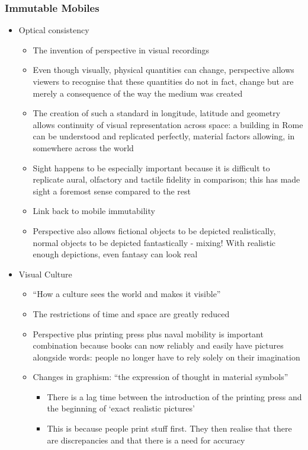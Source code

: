 \documentclass[a4paper]{article}
\begin{document}
\subsubsection{Immutable Mobiles}
\begin{itemize}
	\item Optical consistency
	\begin{itemize}[label=$\circ$]
		\item The invention of perspective in visual recordings
		\item Even though visually, physical quantities can change, perspective allows viewers to recognise that these quantities do not in fact, change but are merely a consequence of the way the medium was created
		\item The creation of such a standard in longitude, latitude and geometry allows continuity of visual representation across space: a building in Rome can be understood and replicated perfectly, material factors allowing, in somewhere across the world
		\item Sight happens to be especially important because it is difficult to replicate aural, olfactory and tactile fidelity in comparison; this has made sight a foremost sense compared to the rest
		\item Link back to mobile immutability
		\item Perspective also allows fictional objects to be depicted realistically, normal objects to be depicted fantastically - mixing! With realistic enough depictions, even fantasy can look real
	\end{itemize}
	\item Visual Culture
	\begin{itemize}[label=$\circ$]
		\item ``How a culture sees the world and makes it visible''
		\item The restrictions of time and space are greatly reduced
		\item Perspective plus printing press plus naval mobility is important combination because books can now reliably and easily have pictures alongside words: people no longer have to rely solely on their imagination
		\item Changes in graphism: “the expression of thought in material symbols”
		\begin{itemize}[label=\textsection]
			\item There is a lag time between the introduction of the printing press and the beginning of `exact realistic pictures'
			\item This is because people print stuff first. They then realise that there are discrepancies and that there is a need for accuracy

\end{itemize}
\end{itemize}
\end{itemize}
\end{document}
